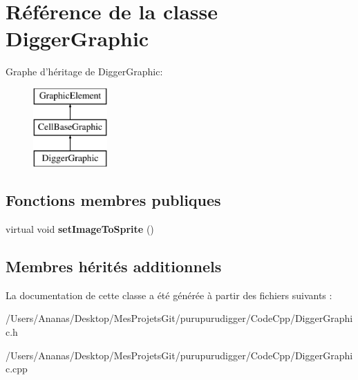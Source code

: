 \hypertarget{class_digger_graphic}{\section{Référence de la classe Digger\-Graphic}
\label{class_digger_graphic}
}
Graphe d'héritage de Digger\-Graphic\-:\begin{figure}[H]
\begin{center}
\leavevmode
\includegraphics[height=3.000000cm]{class_digger_graphic}
\end{center}
\end{figure}
\subsection*{Fonctions membres publiques}
\begin{DoxyCompactItemize}
\item 
\hypertarget{class_digger_graphic_aa52f620e29aed04615addf75d9181eb5}{virtual void {\bfseries set\-Image\-To\-Sprite} ()}\label{class_digger_graphic_aa52f620e29aed04615addf75d9181eb5}

\end{DoxyCompactItemize}
\subsection*{Membres hérités additionnels}


La documentation de cette classe a été générée à partir des fichiers suivants \-:\begin{DoxyCompactItemize}
\item 
/\-Users/\-Ananas/\-Desktop/\-Mes\-Projets\-Git/purupurudigger/\-Code\-Cpp/Digger\-Graphic.\-h\item 
/\-Users/\-Ananas/\-Desktop/\-Mes\-Projets\-Git/purupurudigger/\-Code\-Cpp/Digger\-Graphic.\-cpp\end{DoxyCompactItemize}
